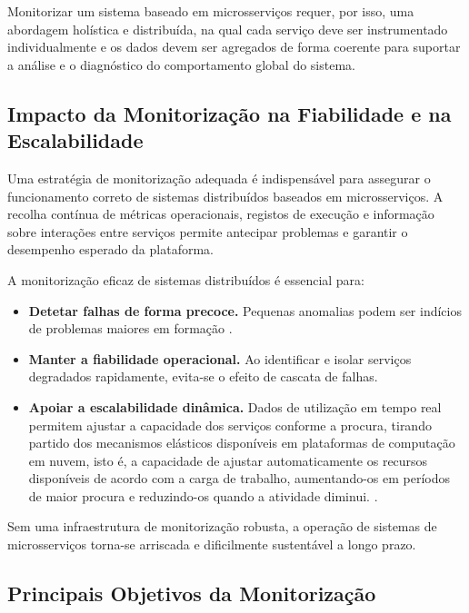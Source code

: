 Monitorizar um sistema baseado em microsserviços requer, por isso, uma abordagem holística e distribuída, na qual cada serviço deve ser instrumentado individualmente e os dados devem ser agregados de forma coerente para suportar a análise e o diagnóstico do comportamento global do sistema.


\subsection{Impacto da Monitorização na Fiabilidade e na Escalabilidade}

Uma estratégia de monitorização adequada é indispensável para assegurar o funcionamento correto de sistemas distribuídos baseados em microsserviços. A recolha contínua de métricas operacionais, registos de execução e informação sobre interações entre serviços permite antecipar problemas e garantir o desempenho esperado da plataforma.

A monitorização eficaz de sistemas distribuídos é essencial para:

\begin{itemize}
    \item \textbf{Detetar falhas de forma precoce.} Pequenas anomalias podem ser indícios de problemas maiores em formação \cite{Burns2015}.
    
    \item \textbf{Manter a fiabilidade operacional.} Ao identificar e isolar serviços degradados rapidamente, evita-se o efeito de cascata de falhas.
    
    \item \textbf{Apoiar a escalabilidade dinâmica.} Dados de utilização em tempo real permitem ajustar a capacidade dos serviços conforme a procura, tirando partido dos mecanismos elásticos disponíveis em plataformas de computação em nuvem, isto é, a capacidade de ajustar automaticamente os recursos disponíveis de acordo com a carga de trabalho, aumentando-os em períodos de maior procura e reduzindo-os quando a atividade diminui. \cite{Dragoni2017}.
\end{itemize}

Sem uma infraestrutura de monitorização robusta, a operação de sistemas de microsserviços torna-se arriscada e dificilmente sustentável a longo prazo.


\subsection{Principais Objetivos da Monitorização}

